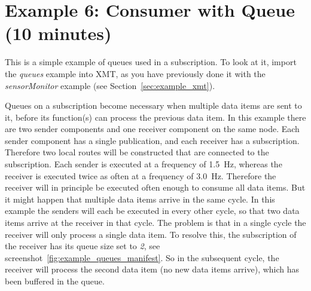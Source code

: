 %
% 
%
%
%

\section{Example 6: Consumer with Queue (10 minutes)}
\label{sec:example_queues}

This is a simple example of queues used in a subscription.
To look at it, import the \textit{queues} example into XMT,
as you have previously done it with the \emph{sensorMonitor} example (see Section~\ref{sec:example_xmt}).

Queues on a subscription become necessary when multiple data items are sent to it,
before its function(s) can process the previous data item.
In this example there are two sender components and one receiver component on the same node.
Each sender component has a single publication, and each receiver has a subscription.
Therefore two local routes will be constructed that are connected to the subscription.
Each sender is executed at a frequency of 1.5~Hz, whereas the receiver is executed twice as often at a frequency of 3.0~Hz.
Therefore the receiver will in principle be executed often enough to consume all data items.
But it might happen that multiple data items arrive in the same cycle.
In this example the senders will each be executed in every other cycle,
so that two data items arrive at the receiver in that cycle.
The problem is that in a single cycle the receiver will only process a single data item.
To resolve this, the subscription of the receiver has its queue size set to \textit{2}, see screenshot~\ref{fig:example_queues_manifest}.
So in the subsequent cycle, the receiver will process the second data item (no new data items arrive),
which has been buffered in the queue.

